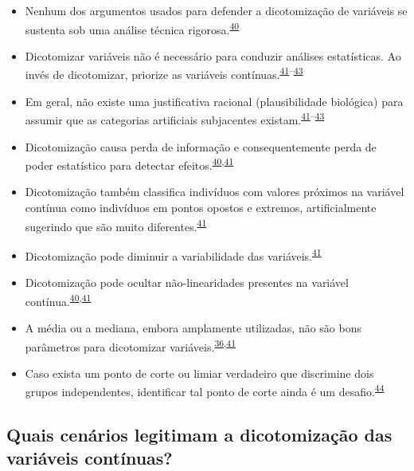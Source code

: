 \documentclass[
]{book}
\begin{document}
\begin{itemize}
\item
  Nenhum dos argumentos usados para defender a dicotomização de variáveis se sustenta sob uma análise técnica rigorosa.\textsuperscript{\protect\hyperlink{ref-MacCallum2002}{40}}
\item
  Dicotomizar variáveis não é necessário para conduzir análises estatísticas. Ao invés de dicotomizar, priorize as variáveis contínuas.\textsuperscript{\protect\hyperlink{ref-Altman2006}{41}--\protect\hyperlink{ref-Collins2016}{43}}
\item
  Em geral, não existe uma justificativa racional (plausibilidade biológica) para assumir que as categorias artificiais subjacentes existam.\textsuperscript{\protect\hyperlink{ref-Altman2006}{41}--\protect\hyperlink{ref-Collins2016}{43}}
\item
  Dicotomização causa perda de informação e consequentemente perda de poder estatístico para detectar efeitos.\textsuperscript{\protect\hyperlink{ref-MacCallum2002}{40},\protect\hyperlink{ref-Altman2006}{41}}
\item
  Dicotomização também classifica indivíduos com valores próximos na variável contínua como indivíduos em pontos opostos e extremos, artificialmente sugerindo que são muito diferentes.\textsuperscript{\protect\hyperlink{ref-Altman2006}{41}}
\item
  Dicotomização pode diminuir a variabilidade das variáveis.\textsuperscript{\protect\hyperlink{ref-Altman2006}{41}}
\item
  Dicotomização pode ocultar não-linearidades presentes na variável contínua.\textsuperscript{\protect\hyperlink{ref-MacCallum2002}{40},\protect\hyperlink{ref-Altman2006}{41}}
\item
  A média ou a mediana, embora amplamente utilizadas, não são bons parâmetros para dicotomizar variáveis.\textsuperscript{\protect\hyperlink{ref-Fedorov2009}{36},\protect\hyperlink{ref-Altman2006}{41}}
\item
  Caso exista um ponto de corte ou limiar verdadeiro que discrimine dois grupos independentes, identificar tal ponto de corte ainda é um desafio.\textsuperscript{\protect\hyperlink{ref-Prince2017}{44}}
\end{itemize}

\hypertarget{quais-cenuxe1rios-legitimam-a-dicotomizauxe7uxe3o-das-variuxe1veis-contuxednuas}{%
\subsection{Quais cenários legitimam a dicotomização das variáveis contínuas?}\label{quais-cenuxe1rios-legitimam-a-dicotomizauxe7uxe3o-das-variuxe1veis-contuxednuas}}
\end{document}
